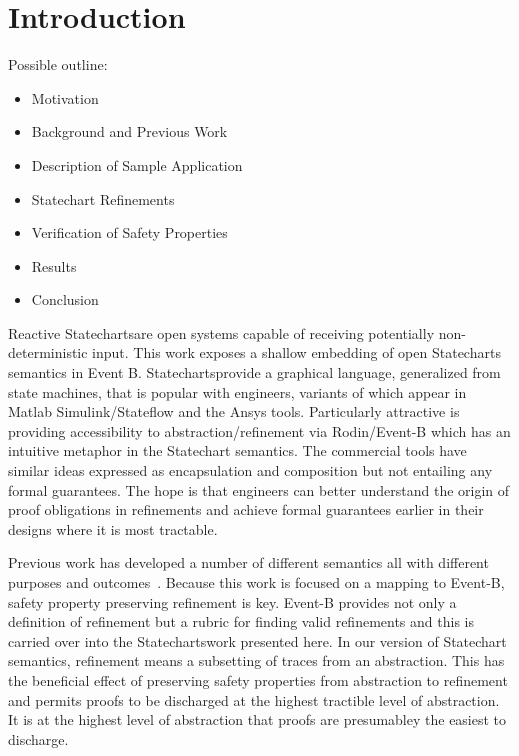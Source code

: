 

\section{Introduction}

Possible outline:
\begin{itemize}
\item Motivation
\item Background and Previous Work
\item Description of Sample Application
\item Statechart Refinements
\item Verification of Safety Properties 
\item Results
\item Conclusion 
\end{itemize}

\newcommand{\SCs}{{{Statecharts}}}
\newcommand{\SC}{{{Statechart}}}


  Reactive \SCs are open systems capable of receiving potentially non-deterministic input.  This work
exposes a shallow embedding of open \SCs\cite{} semantics in Event B.
\SCs provide a graphical language, generalized from state
machines, that is popular with engineers, variants of which appear in
Matlab Simulink/Stateflow\cite{} and the Ansys tools.  Particularly
attractive is providing accessibility to abstraction/refinement via
Rodin/Event-B which has an intuitive metaphor in the Statechart
semantics\cite{prev-work}.  The commercial tools have similar ideas
expressed as encapsulation and composition but not entailing any
formal guarantees.  The hope is that engineers can better understand
the origin of proof obligations in refinements and achieve formal
guarantees earlier in their designs where it is most tractable.

Previous work has developed a number of different semantics all with
different purposes and
outcomes~\cite{Syriani_2019,Harel,Maraninchi91theargos}.  Because this
work is focused on a mapping to Event-B, safety property preserving
refinement is key.  Event-B provides not only a definition of
refinement but a rubric for finding valid refinements and this is
carried over into the \SCs work presented here.  In our version of \SC
semantics, refinement means a subsetting of traces from an
abstraction.  This has the beneficial effect of preserving safety
properties from abstraction to refinement and permits proofs to be
discharged at the highest tractible level of abstraction.  It is at
the highest level of abstraction that proofs are presumabley the
easiest to discharge.

